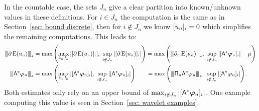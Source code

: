 \documentclass[smallextended]{svjour3}
\newcommand{\Norm}[1]{{\left\vert\kern-0.25ex\left\vert\kern-0.25ex\left\vert #1 \right\vert\kern-0.25ex\right\vert\kern-0.25ex\right\vert}}
\newcommand{\op}[1]{\operatorname{#1}}
\newcommand{\1}{\F{1}}
\newcommand*{\var}[1]{%
	\IfEqCase{#1}{%
		{0}{u}%
		{1}{v}%
		{2}{w}%
	}[u#1]%
}
\begin{document}
	In the countable case, the sets $J_n$ give a clear partition into known/unknown values in these definitions. For $i\in J_n$ the computation is the same as in Section~\ref{sec: bound discrete}, then for $i\notin J_n$ we know $[\var0_n]_i=0$ which simplifies the remaining computations. This leads to:
	\begin{align}
		\Norm{\partial\op{E}(\var0_n)}_* &= \max\left(\max_{i\in J_n}|[\partial\op{E}(\var0_n)]_i|,\ \sup_{i\notin J_n} |[\partial\op{E}(\var0_n)]_i|\right)
		= \max\left(\Norm{\partial_n\op{E}(\var0_n)}_*,\ \sup_{i\notin J_n} |[\A^*\vec{\varphi}_n]_i|-\mu\right)
		\\ \Norm{\A^*\vec{\varphi}_n}_* &= \max\left(\max_{i\in J_n}|[\A^*\vec{\varphi}_n]_i|,\ \sup_{i\notin J_n} |[\A^*\vec{\varphi}_n]_i|\right)
		\hspace{19pt}= \max\left(\Norm{\tens{\Pi}_n\A^*\vec{\varphi}_n}_*,\ \sup_{i\notin J_n} |[\A^*\vec{\varphi}_n]_i|\right).
	\end{align}
	Both estimates only rely on an upper bound of $\max_{i\notin J_n} |[\A^*\vec{\varphi}_n]_i|$. One example computing this value is seen in Section~\ref{sec: wavelet examples}.
	
\end{document}
